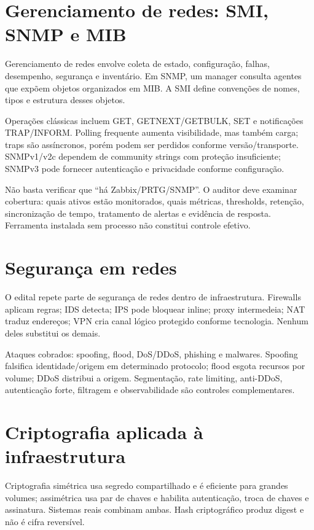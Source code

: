 \section{Gerenciamento de redes: SMI, SNMP e MIB}

Gerenciamento de redes envolve coleta de estado, configuração, falhas, desempenho, segurança e inventário. Em SNMP, um manager consulta agentes que expõem objetos organizados em MIB. A SMI define convenções de nomes, tipos e estrutura desses objetos.

Operações clássicas incluem GET, GETNEXT/GETBULK, SET e notificações TRAP/INFORM. Polling frequente aumenta visibilidade, mas também carga; traps são assíncronos, porém podem ser perdidos conforme versão/transporte. SNMPv1/v2c dependem de community strings com proteção insuficiente; SNMPv3 pode fornecer autenticação e privacidade conforme configuração.

\begin{exemplo}
Não basta verificar que ``há Zabbix/PRTG/SNMP''. O auditor deve examinar cobertura: quais ativos estão monitorados, quais métricas, thresholds, retenção, sincronização de tempo, tratamento de alertas e evidência de resposta. Ferramenta instalada sem processo não constitui controle efetivo.
\end{exemplo}

\section{Segurança em redes}

O edital repete parte de segurança de redes dentro de infraestrutura. Firewalls aplicam regras; IDS detecta; IPS pode bloquear inline; proxy intermedeia; NAT traduz endereços; VPN cria canal lógico protegido conforme tecnologia. Nenhum deles substitui os demais.

Ataques cobrados: spoofing, flood, DoS/DDoS, phishing e malwares. Spoofing falsifica identidade/origem em determinado protocolo; flood esgota recursos por volume; DDoS distribui a origem. Segmentação, rate limiting, anti-DDoS, autenticação forte, filtragem e observabilidade são controles complementares.

\section{Criptografia aplicada à infraestrutura}

Criptografia simétrica usa segredo compartilhado e é eficiente para grandes volumes; assimétrica usa par de chaves e habilita autenticação, troca de chaves e assinatura. Sistemas reais combinam ambas. Hash criptográfico produz digest e não é cifra reversível.

